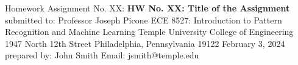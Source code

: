 \documentclass{article}
\begin{document}
    \begin{center}
        \large{Homework Assignment No. XX:}\break
        \break
        \large{\textbf{HW No. XX: Title of the Assignment}}\break
        \break
        \large{submitted to:}\break
        \break
        \large{Professor Joseph Picone}\break
        \large{ECE 8527: Introduction to Pattern Recognition and Machine Learning}\break
        \large{Temple University}\break
        \large{College of Engineering}\break
        \large{1947 North 12th Street}\break
        \large{Philadelphia, Pennsylvania 19122}\break
        \break
        \large{February 3, 2024}\break
        \break
        \large{prepared by: }\break
        \break
        \large{John Smith}\break
        \large{Email: jsmith@temple.edu}
    \end{center}

    \pagebreak
\end{document}
